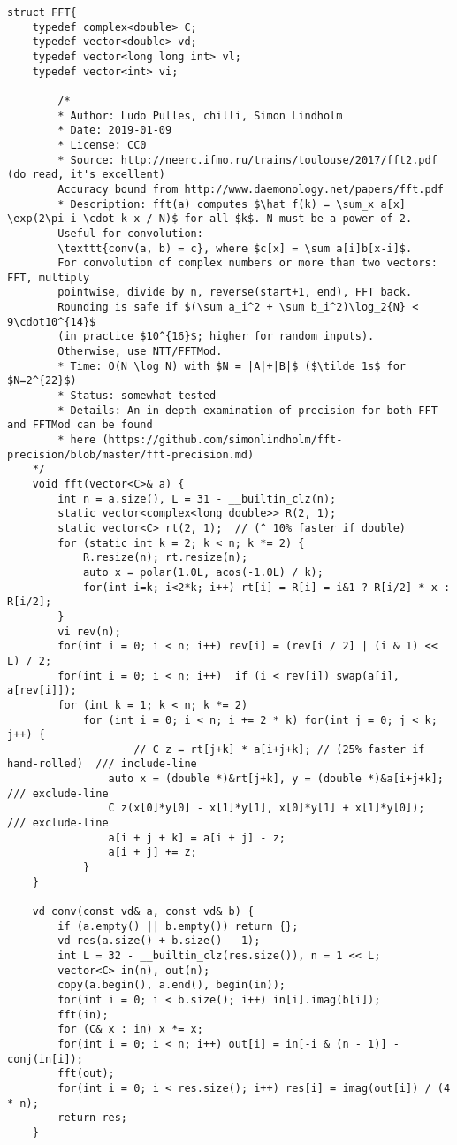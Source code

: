 \documentclass[11pt, a4paper, twoside]{article}
\begin{document}
\begin{verbatim}
struct FFT{
    typedef complex<double> C;
    typedef vector<double> vd;
    typedef vector<long long int> vl;
    typedef vector<int> vi;
     
        /*
        * Author: Ludo Pulles, chilli, Simon Lindholm
        * Date: 2019-01-09
        * License: CC0
        * Source: http://neerc.ifmo.ru/trains/toulouse/2017/fft2.pdf (do read, it's excellent)
        Accuracy bound from http://www.daemonology.net/papers/fft.pdf
        * Description: fft(a) computes $\hat f(k) = \sum_x a[x] \exp(2\pi i \cdot k x / N)$ for all $k$. N must be a power of 2.
        Useful for convolution:
        \texttt{conv(a, b) = c}, where $c[x] = \sum a[i]b[x-i]$.
        For convolution of complex numbers or more than two vectors: FFT, multiply
        pointwise, divide by n, reverse(start+1, end), FFT back.
        Rounding is safe if $(\sum a_i^2 + \sum b_i^2)\log_2{N} < 9\cdot10^{14}$
        (in practice $10^{16}$; higher for random inputs).
        Otherwise, use NTT/FFTMod.
        * Time: O(N \log N) with $N = |A|+|B|$ ($\tilde 1s$ for $N=2^{22}$)
        * Status: somewhat tested
        * Details: An in-depth examination of precision for both FFT and FFTMod can be found
        * here (https://github.com/simonlindholm/fft-precision/blob/master/fft-precision.md)
    */
    void fft(vector<C>& a) {
        int n = a.size(), L = 31 - __builtin_clz(n);
        static vector<complex<long double>> R(2, 1);
        static vector<C> rt(2, 1);  // (^ 10% faster if double)
        for (static int k = 2; k < n; k *= 2) {
            R.resize(n); rt.resize(n);
            auto x = polar(1.0L, acos(-1.0L) / k);
            for(int i=k; i<2*k; i++) rt[i] = R[i] = i&1 ? R[i/2] * x : R[i/2];
        }
        vi rev(n);
        for(int i = 0; i < n; i++) rev[i] = (rev[i / 2] | (i & 1) << L) / 2;
        for(int i = 0; i < n; i++)  if (i < rev[i]) swap(a[i], a[rev[i]]);
        for (int k = 1; k < n; k *= 2)
            for (int i = 0; i < n; i += 2 * k) for(int j = 0; j < k; j++) {
                    // C z = rt[j+k] * a[i+j+k]; // (25% faster if hand-rolled)  /// include-line
                auto x = (double *)&rt[j+k], y = (double *)&a[i+j+k];        /// exclude-line
                C z(x[0]*y[0] - x[1]*y[1], x[0]*y[1] + x[1]*y[0]);           /// exclude-line
                a[i + j + k] = a[i + j] - z;
                a[i + j] += z;
            }
    }
        
    vd conv(const vd& a, const vd& b) {
        if (a.empty() || b.empty()) return {};
        vd res(a.size() + b.size() - 1);
        int L = 32 - __builtin_clz(res.size()), n = 1 << L;
        vector<C> in(n), out(n);
        copy(a.begin(), a.end(), begin(in));
        for(int i = 0; i < b.size(); i++) in[i].imag(b[i]);
        fft(in);
        for (C& x : in) x *= x;
        for(int i = 0; i < n; i++) out[i] = in[-i & (n - 1)] - conj(in[i]);
        fft(out);
        for(int i = 0; i < res.size(); i++) res[i] = imag(out[i]) / (4 * n);
        return res;
    }
    

\end{verbatim}
\end{document}
